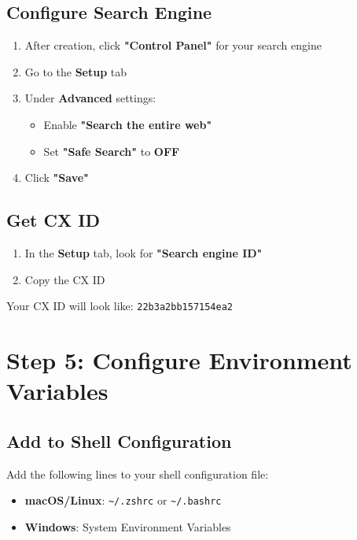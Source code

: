 \documentclass[11pt,a4paper]{article}
\begin{document}
\subsection{Configure Search Engine}

\begin{enumerate}
    \item After creation, click \textbf{"Control Panel"} for your search engine
    \item Go to the \textbf{Setup} tab
    \item Under \textbf{Advanced} settings:
    \begin{itemize}
        \item Enable \textbf{"Search the entire web"}
        \item Set \textbf{"Safe Search"} to \textbf{OFF}
    \end{itemize}
    \item Click \textbf{"Save"}
\end{enumerate}

\subsection{Get CX ID}

\begin{enumerate}
    \item In the \textbf{Setup} tab, look for \textbf{"Search engine ID"}
    \item Copy the CX ID
\end{enumerate}

\begin{tcolorbox}[colback=codebg,colframe=gray,title=CX ID Format]
Your CX ID will look like: \texttt{22b3a2bb157154ea2}
\end{tcolorbox}

\section{Step 5: Configure Environment Variables}

\subsection{Add to Shell Configuration}

Add the following lines to your shell configuration file:

\begin{itemize}
    \item \textbf{macOS/Linux}: \texttt{\textasciitilde/.zshrc} or \texttt{\textasciitilde/.bashrc}
    \item \textbf{Windows}: System Environment Variables
\end{itemize}
\end{document}
